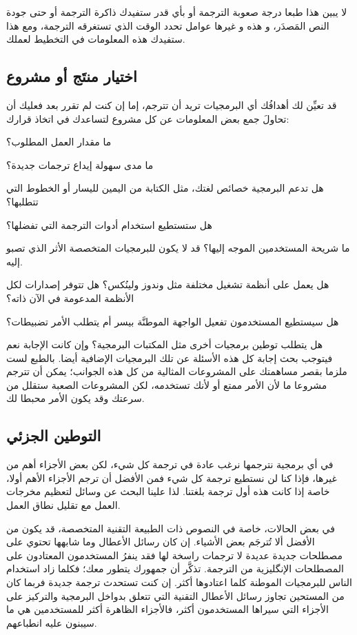 لا يبين هذا طبعا درجة صعوبة الترجمة أو بأي قدر ستفيدك ذاكرة الترجمة أو
حتى جودة النص المَصدَر، و هذه و غيرها عوامل تحدد الوقت الذي تستغرقه
الترجمة، ومع هذا ستفيدك هذه المعلومات في التخطيط لعملك.

\subsection{اختيار منتَج أو مشروع}
قد تعيِّن لك أهدافُك أي البرمجيات
تريد أن تترجم، إما إن كنت لم تقرر بعد فعليك أن تحاولَ جمع بعض المعلومات
عن كل مشروع لتساعدك في اتخاذ قرارك:

\startitemize[1]
\item ما مقدار العمل المطلوب؟
\item ما مدى سهولة إيداع ترجمات جديدة؟
\item هل تدعم البرمجية خصائص لغتك، مثل الكتابة من اليمين لليسار أو
الخطوط التي تتطلبها؟
\item هل ستستطيع استخدام أدوات الترجمة التي تفضلها؟
\item ما شريحة المستخدمين الموجه إليها؟ قد لا يكون للبرمجيات المتخصصة
الأثر الذي تصبو إليه.
\item هل يعمل على أنظمة تشغيل مختلفة مثل وندوز ولينُكس؟ هل تتوفر إصدارات
لكل الأنظمة المدعومة في الآن ذاته؟
\item هل سيستطيع المستخدمون تفعيل الواجهة الموطنَّة بيسر أم يتطلب الأمر
تضبيطات؟
\item هل يتطلب توطين برمجيات أخرى مثل المكتبات البرمجية؟ وإن كانت
الإجابة نعم فيتوجب بحث إجابة كل هذه الأسئلة عن تلك البرمجيات الإضافية
أيضا.
\stopitemize
بالطبع لست ملزما بقصر مساهمتك على المشروعات المثالية من كل هذه الجوانب؛
يمكن أن تترجم مشروعا ما لأن الأمر ممتع أو لأنك تستخدمه، لكن المشروعات
الصعبة ستقلل من سرعتك وقد يكون الأمر محبطا لك.

\subsection{التوطين الجزئي}
في أي برمجية نترجمها نرغب عادة في ترجمة كل شيء، لكن بعض الأجزاء أهم من
غيرها، فإذا كنا لن نستطيع ترجمة كل شيء فمن الأفضل أن ترجم الأجزاء الأهم
أولا، خاصة إذا كانت هذه أول ترجمة بلغتنا. لذا علينا البحث عن وسائل
لتعظيم مخرجات العمل مع تقليل نطاق العمل.

في بعض الحالات، خاصة في النصوص ذات الطبيعة التقنية المتخصصة، قد يكون من
الأفضل ألا تُترجَم بعض الأشياء. إن كان رسائل الأعطال وما شابهها تحتوي
على مصطلحات جديدة عديدة لا ترجمات راسخة لها فقد ينفرُ المستخدمون
المعتادون على المصطلحات الإنگليزية من الترجمة. تذكَّر أن جمهورك يتطور
معك؛ فكلما زاد استخدام الناس للبرمجيات الموطنة كلما اعتادوها أكثر. إن
كنت تستحدث ترجمة جديدة فربما كان من المستحين تجاوز رسائل الأعطال
التقنية التي تتعلق بدواخل البرمجية والتركيز على الأجزاء التي سيراها
المستخدمون أكثر، فالأجزاء الظاهرة أكثر للمستخدمين هي ما سيبنون عليه
انطباعهم.

